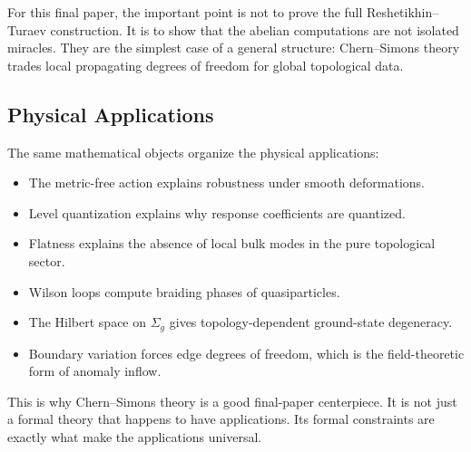 For this final paper, the important point is not to prove the full Reshetikhin--Turaev construction. It is to show that the abelian computations are not isolated miracles. They are the simplest case of a general structure: Chern--Simons theory trades local propagating degrees of freedom for global topological data.

\subsection{Physical Applications}
\label{subsec:synthesis-physical-fit}

The same mathematical objects organize the physical applications:
\begin{itemize}
  \item The metric-free action explains robustness under smooth deformations.
  \item Level quantization explains why response coefficients are quantized.
  \item Flatness explains the absence of local bulk modes in the pure topological sector.
  \item Wilson loops compute braiding phases of quasiparticles.
  \item The Hilbert space on $\Sigma_g$ gives topology-dependent ground-state degeneracy.
  \item Boundary variation forces edge degrees of freedom, which is the field-theoretic form of anomaly inflow.
\end{itemize}
This is why Chern--Simons theory is a good final-paper centerpiece. It is not just a formal theory that happens to have applications. Its formal constraints are exactly what make the applications universal.
